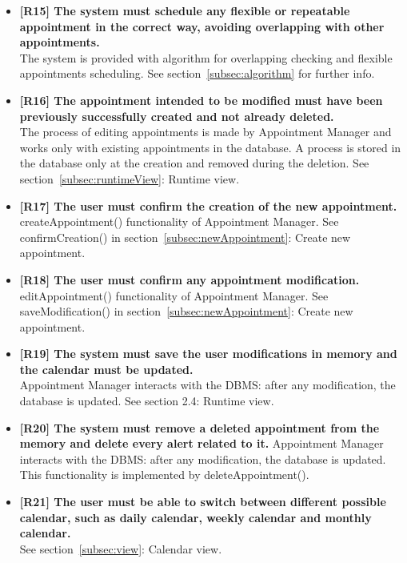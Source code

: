 \begin{itemize}
\item \textbf{[R15] The system must schedule any flexible or repeatable appointment in the correct way, avoiding overlapping with other appointments.}\\
The system is provided with algorithm for overlapping checking and flexible appointments scheduling. See section~\ref{subsec:algorithm} for further info.

\item \textbf{[R16] The appointment intended to be modified must have been previously successfully created
and not already deleted.}\\
The process of editing appointments is made by Appointment Manager and works only with existing appointments in the database. A process is stored in the database only at the creation and removed during the deletion. See section~\ref{subsec:runtimeView}: Runtime view.

\item \textbf{[R17] The user must confirm the creation of the new appointment.}\\
createAppointment() functionality of Appointment Manager. See confirmCreation() in section~\ref{subsec:newAppointment}: Create new appointment.

\item \textbf{[R18] The user must confirm any appointment modification.}\\
editAppointment() functionality of Appointment Manager. See saveModification() in section~\ref{subsec:newAppointment}: Create new appointment.

\item \textbf{[R19] The system must save the user modifications in memory and the calendar must be updated.}\\
Appointment Manager interacts with the DBMS: after any modification, the database is updated. See section 2.4: Runtime view.

\item \textbf{[R20] The system must remove a deleted appointment from the memory and delete every alert
related to it.}
Appointment Manager interacts with the DBMS: after any modification, the database is updated.
This functionality is implemented by deleteAppointment().

\item \textbf{[R21] The user must be able to switch between different possible calendar, such as daily calendar, weekly calendar and monthly calendar.}\\
See section~\ref{subsec:view}: Calendar view.


\end{itemize}
